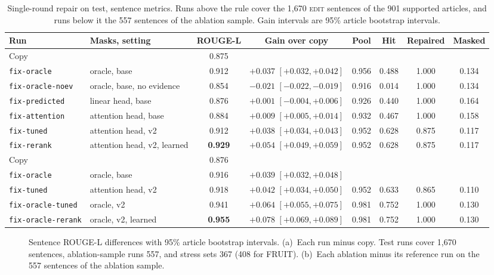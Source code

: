 \documentclass[]{paper}
\newcommand{\edit}{\textsc{edit}}
\newcommand{\run}[1]{\texttt{#1}}
\begin{document}
\begin{table}[H]
\caption{Single-round repair on test, sentence metrics. Runs above the rule cover the 1,670 \edit{} sentences of the 901 supported articles, and runs below it the 557 sentences of the ablation sample. Gain intervals are 95\% article bootstrap intervals.}
\label{tab:repair}
\centering
\footnotesize
\setlength{\tabcolsep}{4pt}
\begin{tabular}{llcccccc}
\toprule
Run & Masks, setting & ROUGE-L & Gain over copy & Pool & Hit & Repaired & Masked \\
\midrule
Copy & & 0.875 & & & & & \\
\run{fix-oracle} & oracle, base & 0.912 & $+0.037$ $[+0.032, +0.042]$ & 0.956 & 0.488 & 1.000 & 0.134 \\
\run{fix-oracle-noev} & oracle, base, no evidence & 0.854 & $-0.021$ $[-0.022, -0.019]$ & 0.916 & 0.014 & 1.000 & 0.134 \\
\run{fix-predicted} & linear head, base & 0.876 & $+0.001$ $[-0.004, +0.006]$ & 0.926 & 0.440 & 1.000 & 0.164 \\
\run{fix-attention} & attention head, base & 0.884 & $+0.009$ $[+0.005, +0.014]$ & 0.932 & 0.467 & 1.000 & 0.158 \\
\run{fix-tuned} & attention head, v2 & 0.912 & $+0.038$ $[+0.034, +0.043]$ & 0.952 & 0.628 & 0.875 & 0.117 \\
\run{fix-rerank} & attention head, v2, learned & \textbf{0.929} & $+0.054$ $[+0.049, +0.059]$ & 0.952 & 0.628 & 0.875 & 0.117 \\
\midrule
Copy & & 0.876 & & & & & \\
\run{fix-oracle} & oracle, base & 0.916 & $+0.039$ $[+0.032, +0.048]$ & & & & \\
\run{fix-tuned} & attention head, v2 & 0.918 & $+0.042$ $[+0.034, +0.050]$ & 0.952 & 0.633 & 0.865 & 0.110 \\
\run{fix-oracle-tuned} & oracle, v2 & 0.941 & $+0.064$ $[+0.055, +0.075]$ & 0.981 & 0.752 & 1.000 & 0.130 \\
\run{fix-oracle-rerank} & oracle, v2, learned & \textbf{0.955} & $+0.078$ $[+0.069, +0.089]$ & 0.981 & 0.752 & 1.000 & 0.130 \\
\bottomrule
\end{tabular}
\end{table}

\begin{figure}[t]
\centering

\caption{Sentence ROUGE-L differences with 95\% article bootstrap intervals. (a)~Each run minus copy. Test runs cover 1,670 sentences, ablation-sample runs 557, and stress sets 367 (408 for FRUIT). (b)~Each ablation minus its reference run on the 557 sentences of the ablation sample.}
\label{fig:forest}
\end{figure}
\end{document}
